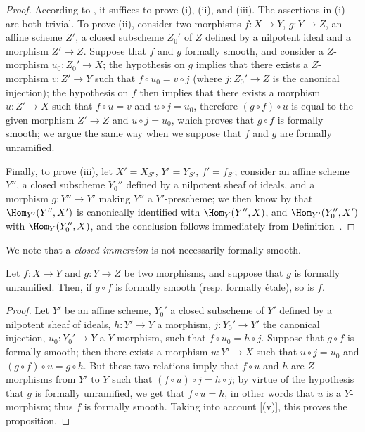 \begin{proof}
According to , it suffices to prove (i), (ii), and (iii). 
The assertions in (i) are both trivial.
To prove (ii), consider two morphisms $f:X\to Y$, $g:Y\to Z$, an affine scheme $Z'$, a closed subscheme $Z_0'$ of $Z$ defined by a nilpotent ideal and a morphism $Z'\to Z$. 
Suppose that $f$ and $g$ formally smooth, and consider a $Z$-morphism
$u_0:Z_0'\to X$;
the hypothesis  on $g$ implies that there exists a $Z$-morphism $v:Z'\to Y$ such that $f\circ u_0=v\circ j$ (where $j:Z_0'\to Z$ is the canonical injection);
the hypothesis on $f$ then implies that there exists a morphism $u:Z'\to X$ such that $f\circ u=v$ and $u\circ j=u_0$, therefore $(g\circ f)\circ u$ is equal to the given morphism $Z'\to Z$ and $u\circ j=u_0$, which proves that $g\circ f$ is formally smooth;
we argue the same way when we suppose that $f$ and $g$ are formally unramified.

Finally, to prove (iii), let $X'=X_{S'}$, $Y'=Y_{S'}$, $f'=f_{S'}$;
consider an affine scheme $Y''$, a closed subscheme $Y_0''$ defined by a nilpotent sheaf of ideals, and a morphism $g:Y''\to Y'$ making $Y''$ a $Y'$-prescheme;
we then know by  that $\Hom_{Y'}(Y'',X')$ is canonically identified with $\Hom_Y(Y'',X)$, and $\Hom_{Y'}(Y_0'',X')$ with $\Hom_Y(Y_0'',X)$, and the conclusion follows immediately from Definition~.
\end{proof}

We note that a \emph{closed immersion} is not necessarily formally smooth.
\begin{proposition}[17.1.4]
\label{IV.17.1.4}
Let $f:X\to Y$ and $g:Y\to Z$ be two morphisms, and suppose that $g$ is formally unramified.
Then, if $g\circ f$ is formally smooth (resp. formally \'etale), so is $f$.
\end{proposition}

\begin{proof}
Let $Y'$ be an affine scheme, $Y_0'$ a closed subscheme of $Y'$ defined by a nilpotent sheaf of ideals, $h:Y'\to Y$ a morphism, $j:Y_0'\to Y'$ the canonical injection, $u_0:Y_0'\to Y$ a $Y$-morphism, such that $f\circ u_0=h\circ j$. 
Suppose that $g\circ f$ is formally smooth;
then there exists a morphism $u:Y'\to X$ such that $u\circ j=u_0$ and $(g\circ f)\circ u=g\circ h$. 
But these two relations imply that $f\circ u$ and $h$ are $Z$-morphisms from $Y'$ to $Y$ such that $(f\circ u)\circ j=h\circ j$;
by virtue of the hypothesis that $g$ is formally unramified, we get that $f\circ u=h$, in other words that $u$ is a $Y$-morphism;
thus $f$ is formally smooth.
Taking into account [(v)], this proves the proposition.
\end{proof}

